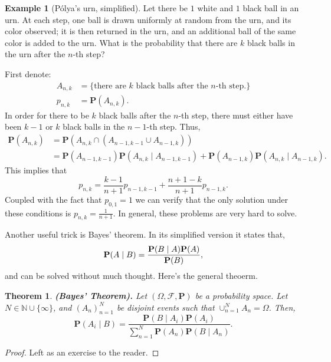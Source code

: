 \documentclass[11pt,a4paper]{article}
\theoremstyle{definition}
\newtheorem{example}{Example}[section]
\theoremstyle{plain}
\newtheorem{theorem}{Theorem}[section]
\newcommand{\N}{\mathbb{N}}
\renewcommand{\tt}[1]{\textnormal{\textbf{(#1).}}} %
\begin{document}
  \begin{example}[P\'olya's urn, simplified]
     Let there be $1$ white and $1$ black ball in an urn. 
     At each step, one ball is drawn uniformly at random from the urn, 
     and its color observed; 
     it is then returned in the urn, 
     and an additional ball of the same color is added to the urn.
     What is the probability that there are $k$ black balls in the urn after
     the $n$-th step?

     First denote:
     \begin{align*}
       A_{n,k} &= \{\text{there are $k$ black balls after the $n$-th step.}\} \\
       p_{n,k} &= \mathbf P(A_{n,k}).
     \end{align*}
     In order for there to be $k$ black balls after the $n$-th step, there must
     either have been $k-1$ or $k$ black balls in the $n-1$-th step. Thus,
     \begin{align*}
       \mathbf{P}(A_{n,k}) &= 
       \mathbf{P}(A_{n,k} \cap (A_{n-1,k-1} \cup A_{n-1,k})) \\ &= 
       \mathbf{P}(A_{n-1,k-1}) \mathbf{P}(A_{n,k} \mid A_{n-1,k-1}) + 
       \mathbf{P}(A_{n-1,k}) \mathbf{P}(A_{n,k} \mid A_{n-1,k}).
     \end{align*}
     This implies that
     \[ p_{n,k}=\frac{k-1}{n+1}p_{n-1,k-1}+\frac{n+1-k}{n+1}p_{n-1,k}. \]
     Coupled with the fact that $p_{0,1} = 1$ we can verify that the only
     solution under these conditions is $p_{n,k} = \frac{1}{n+1}$.
     In general, these problems are very hard to solve.
  \end{example}

  Another useful trick is Bayes' theorem.
  In its simplified version it states that,
  \[
    {\bf P}(A \mid B)={\frac{{\bf P}(B \mid A){\bf P}(A)}{{\bf P}(B)}},
  \]
  and can be solved without much thought. Here's the general theoerm.

  \begin{theorem}\tt{Bayes' Theorem}
    Let $(\Omega, \mathcal F, \mathbf P)$ be a probability space.
    Let $N \in \N \cup \{\infty\}$, and $(A_n)_{n=1}^{N}$ be disjoint events
    such that $\cup_{n=1}^{N} A_n = \Omega$. Then,
    \[
      \mathbf{P}(A_i \mid B) = 
      {\frac{\mathbf{P}(B \mid A_{i})\mathbf{P}(A_{i})}
      {\sum_{n=1}^{N}\mathbf{P}(A_{n})\mathbf{P}(B \mid A_{n})}}.
    \]
  \end{theorem}
  \begin{proof}
    Left as an exercise to the reader.
  \end{proof}
\end{document}
